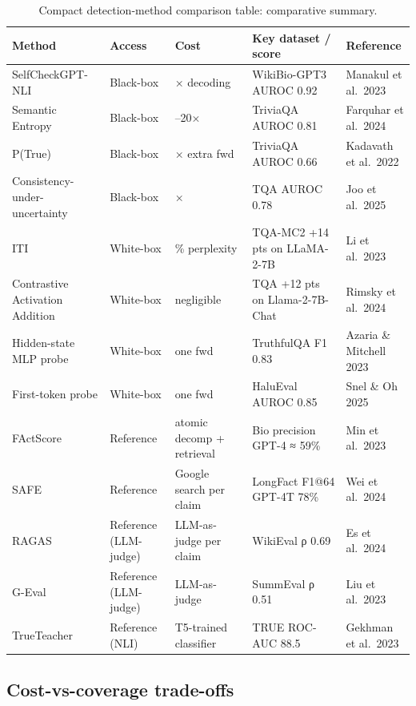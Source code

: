 \documentclass{article}
\begin{document}
\begin{table}[t]
\centering
\caption{Compact detection-method comparison table: comparative summary.}
\label{tab:compact-detection-method-comparison-table}
\begin{tabular}{>{\raggedright\arraybackslash}p{0.2403\linewidth}
  >{\raggedright\arraybackslash}p{0.1628\linewidth}
  >{\raggedright\arraybackslash}p{0.1938\linewidth}
  >{\raggedright\arraybackslash}p{0.2326\linewidth}
  >{\raggedright\arraybackslash}p{0.1705\linewidth}}
\toprule
Method & Access & Cost & Key dataset / score & Reference \\
\midrule
SelfCheckGPT-NLI & Black-box & 20× decoding & WikiBio-GPT3 AUROC 0.92 & Manakul et al.~2023 \\
Semantic Entropy & Black-box & 10--20× & TriviaQA AUROC 0.81 & Farquhar et al.~2024 \\
P(True) & Black-box & 1× extra fwd & TriviaQA AUROC 0.66 & Kadavath et al.~2022 \\
Consistency-under-uncertainty & Black-box & 5× & TQA AUROC 0.78 & Joo et al.~2025 \\
ITI & White-box & 0.5\% perplexity & TQA-MC2 +14 pts on LLaMA-2-7B & Li et al.~2023 \\
Contrastive Activation Addition & White-box & negligible & TQA +12 pts on Llama-2-7B-Chat & Rimsky et al.~2024 \\
Hidden-state MLP probe & White-box & one fwd & TruthfulQA F1 0.83 & Azaria \& Mitchell 2023 \\
First-token probe & White-box & one fwd & HaluEval AUROC 0.85 & Snel \& Oh 2025 \\
FActScore & Reference & atomic decomp + retrieval & Bio precision GPT-4 ≈ 59\% & Min et al.~2023 \\
SAFE & Reference & Google search per claim & LongFact F1@64 GPT-4T 78\% & Wei et al.~2024 \\
RAGAS & Reference (LLM-judge) & LLM-as-judge per claim & WikiEval ρ 0.69 & Es et al.~2024 \\
G-Eval & Reference (LLM-judge) & LLM-as-judge & SummEval ρ 0.51 & Liu et al.~2023 \\
TrueTeacher & Reference (NLI) & T5-trained classifier & TRUE ROC-AUC 88.5 & Gekhman et al.~2023 \\
\end{tabular}
\end{table}

\subsection{Cost-vs-coverage trade-offs}\label{cost-vs-coverage-trade-offs}
\end{document}

